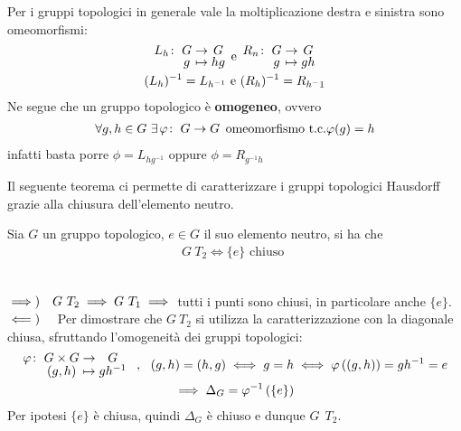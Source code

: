\begin{observe}
	Per i gruppi topologici in generale vale la moltiplicazione destra e sinistra sono omeomorfismi:
		\begin{gather*}
			\funztot {L_h} G G g {hg} \text{   e   } \funztot {R_n}  G G g {gh} \\
			(L_h)^{-1}=L_{h^{-1}} \text{   e   } (R_h)^{-1}=R_{h^-1}
		\end{gather*}
	Ne segue che un gruppo topologico è \textbf{omogeneo}, ovvero
		\begin{gather*}
			\forall g,h\in G \ \exists \funz \phi G G \text{ omeomorfismo t.c.} \phi(g)=h
		\end{gather*}
	infatti basta porre $\phi=L_{hg^{-1}}$ oppure $\phi=R_{g^{-1}h}$
\end{observe}
Il seguente teorema ci permette di caratterizzare i gruppi topologici Hausdorff grazie alla chiusura dell'elemento neutro. 
\begin{theorema}
	Sia $G$ un gruppo topologico, $e\in G$ il suo elemento neutro, si ha che 
		\begin{gather*}
			G \ T_2 \iff \{e\} \text{ chiuso }
		\end{gather*}
\end{theorema}
\begin{demonstration}~{}\\
	$\implies)\quad G \ T_2 \implies G \ T_1 \implies$ tutti i punti sono chiusi, in particolare anche $\{e\}$. \newline
	$\impliedby)\quad$ Per dimostrare che $G \ T_2$ si utilizza la caratterizzazione con la diagonale chiusa, sfruttando l'omogeneità dei gruppi topologici:
		\begin{gather*}
			\funztot \phi {G\times G} G {(g,h)} {gh^{-1}} \ \ , \ \ (g,h)=(h,g) \iff g=h\iff \phi\left( (g,h)\right)=gh^{-1}=e \\
			\implies \Delta_G =\phi^{-1}\left(\{e\}\right)
		\end{gather*}
	Per ipotesi $\{e\}$ è chiusa, quindi $\Delta_G$ è chiuso e dunque $G \ \ T_2$.
\end{demonstration}

